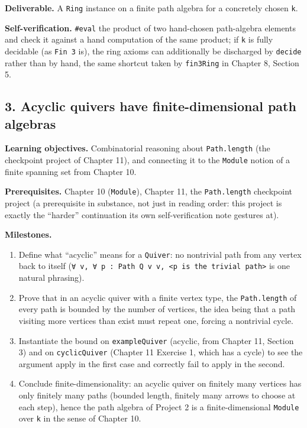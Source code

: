\textbf{Deliverable.} A \texttt{Ring} instance on a finite path algebra for a concretely chosen \texttt{k}.

\textbf{Self-verification.} \texttt{\#eval} the product of two hand-chosen path-algebra elements and check it against a hand computation of the same product; if \texttt{k} is fully decidable (as \texttt{Fin 3} is), the ring axioms can additionally be discharged by \texttt{decide} rather than by hand, the same shortcut taken by \texttt{fin3Ring} in Chapter 8, Section 5.

\subsection{3. Acyclic quivers have finite-dimensional path algebras}\label{sec:13-next-steps:03-next-projects:4}

\textbf{Learning objectives.} Combinatorial reasoning about \texttt{Path.length} (the checkpoint project of Chapter 11), and connecting it to the \texttt{Module} notion of a finite spanning set from Chapter 10.

\textbf{Prerequisites.} Chapter 10 (\texttt{Module}), Chapter 11, the \texttt{Path.length} checkpoint project (a prerequisite in substance, not just in reading order: this project is exactly the ``harder'' continuation its own self-verification note gestures at).

\textbf{Milestones.}

\begin{enumerate}
\def\labelenumi{\arabic{enumi}.}
\tightlist
\item
  Define what ``acyclic'' means for a \texttt{Quiver}: no nontrivial path from any vertex back to itself (\texttt{∀ v, ∀ p : Path Q v v, <p is the trivial path>} is one natural phrasing).
\item
  Prove that in an acyclic quiver with a finite vertex type, the \texttt{Path.length} of every path is bounded by the number of vertices, the idea being that a path visiting more vertices than exist must repeat one, forcing a nontrivial cycle.
\item
  Instantiate the bound on \texttt{exampleQuiver} (acyclic, from Chapter 11, Section 3) and on \texttt{cyclicQuiver} (Chapter 11 Exercise 1, which has a cycle) to see the argument apply in the first case and correctly fail to apply in the second.
\item
  Conclude finite-dimensionality: an acyclic quiver on finitely many vertices has only finitely many paths (bounded length, finitely many arrows to choose at each step), hence the path algebra of Project 2 is a finite-dimensional \texttt{Module} over \texttt{k} in the sense of Chapter 10.
\end{enumerate}

